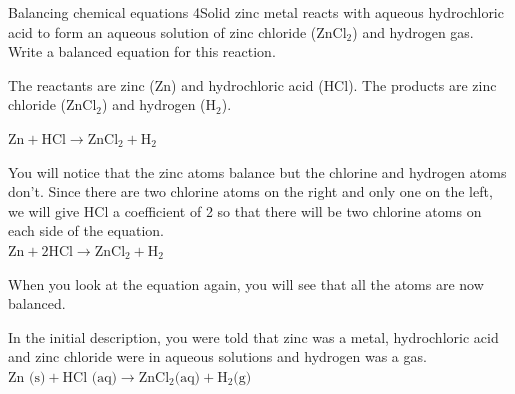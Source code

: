 \begin{wex}{Balancing chemical equations 4}{Solid zinc metal reacts with aqueous hydrochloric acid to form an aqueous solution of zinc chloride ($\text{ZnCl}_{2}$) and hydrogen gas. Write a balanced equation for this reaction.}

{
The reactants are zinc ($\text{Zn}$) and hydrochloric acid ($\text{HCl}$). The products are zinc chloride ($\text{ZnCl}_{2}$) and hydrogen ($\text{H}_{2}$).

${\text{Zn} + \text{HCl} \rightarrow \text{ZnCl}_{2} + \text{H}_{2}}$

You will notice that the zinc atoms balance but the chlorine and hydrogen atoms don't. Since there are two chlorine atoms on the right and only one on the left, we will give HCl a coefficient of 2 so that there will be two chlorine atoms on each side of the equation.\\
${\text{Zn} + 2\text{HCl} \rightarrow \text{ZnCl}_{2} + \text{H}_{2}}$

When you look at the equation again, you will see that all the atoms are now balanced.

In the initial description, you were told that zinc was a metal, hydrochloric acid and zinc chloride were in aqueous solutions and hydrogen was a gas.\\
$\text{Zn (s)} + \text{HCl (aq)} \rightarrow \text{ZnCl}_{2} \text{(aq)} + \text{H}_{2} \text{(g)}$
}
\end{wex}
    \noindent
\par

